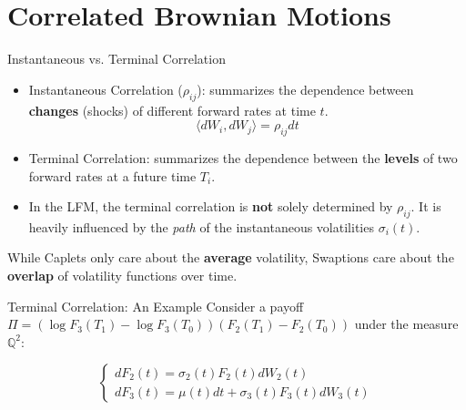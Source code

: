 \documentclass{beamer}
\begin{document}
\section{Correlated Brownian Motions}

\begin{frame}{Instantaneous vs. Terminal Correlation}
	\begin{itemize}
		\item<1-> Instantaneous Correlation ($\rho_{ij}$): summarizes the dependence between \textbf{changes} (shocks) of different forward rates at time $t$.
		\begin{equation*}
			\langle dW_i, dW_j \rangle = \rho_{ij} dt
		\end{equation*}
		\item<2-> Terminal Correlation: summarizes the dependence between the \textbf{levels} of two forward rates at a future time $T_i$.
		\item<3-> In the LFM, the terminal correlation is \textbf{not} solely determined by $\rho_{ij}$. It is heavily influenced by the \textit{path} of the instantaneous volatilities $\sigma_i(t)$.
	\end{itemize}
	 {
	\begin{tcolorbox}[colback=gray!5, colframe=maincolor, arc=0mm, boxrule=0.5pt]
		\footnotesize
		While Caplets only care about the \textbf{average} volatility, Swaptions care about the \textbf{overlap} of volatility functions over time.
	\end{tcolorbox}
	}
\end{frame}

\begin{frame}{Terminal Correlation: An Example}
	Consider a payoff $\Pi = (\log F_3(T_1) - \log F_3(T_0))(F_2(T_1) - F_2(T_0))$ under the measure $\mathbb{Q}^2$:

	\begin{equation*}
		\begin{cases}
			dF_2(t) = \sigma_{2}(t)F_2(t)dW_2(t) \\
			dF_3(t) = \mu(t)dt + \sigma_{3}(t)F_3(t)dW_3(t)
		\end{cases}
	\end{equation*}

\end{frame}
\end{document}
